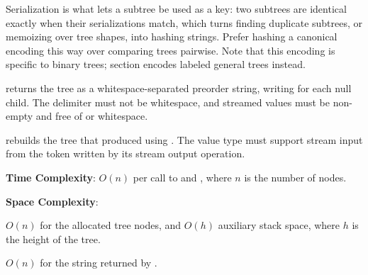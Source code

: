 Serialization is what lets a subtree be used as a key: two subtrees are identical exactly when their serializations match, which turns finding duplicate subtrees, or memoizing over tree shapes, into hashing strings. Prefer hashing a canonical encoding this way over comparing trees pairwise. Note that this encoding is specific to binary trees; section  encodes labeled general trees instead.

\begin{compactitem}
  \item {} returns the tree as a whitespace-separated preorder string, writing  for each null child. The delimiter must not be whitespace, and streamed values must be non-empty and free of  or whitespace.
  \item {} rebuilds the tree that  produced using . The value type must support stream input from the token written by its stream output operation.
\end{compactitem}

\textbf{Time Complexity}: $O(n)$ per call to  and , where $n$ is the number of nodes.

\textbf{Space Complexity}:
\begin{compactitem}
  \item $O(n)$ for the allocated tree nodes, and $O(h)$ auxiliary stack space, where $h$ is the height of the tree.
  \item $O(n)$ for the string returned by .
\end{compactitem}

